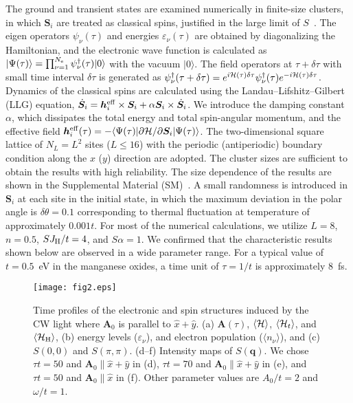 \documentclass[aps,twocolumn,showpacs,prl,amsmath,amssymb]{revtex4-1}
\begin{document}
The ground and transient states are examined numerically in finite-size clusters, in which 
$\bm{S}_i$ are treated as classical spins, justified in the large limit of $S$~\cite{koshibae1}. 
The eigen operators $\psi_\nu(\tau)$ and energies $\varepsilon_\nu(\tau)$ are obtained by diagonalizing the Hamiltonian, and the electronic wave function is calculated as $|\Psi(\tau)\rangle=\prod_{\nu=1}^{N_{\rm e}} \psi^\dagger_\nu (\tau) |0\rangle$ with the vacuum $| 0\rangle$. 
The field operators at $\tau+\delta \tau$ with small time interval $\delta \tau$ is generated as $\psi_\nu^\dagger (\tau + \delta \tau)=e^{i {\cal H}(\tau)\delta \tau}\psi_\nu^\dagger (\tau)e^{-i{\cal H}(\tau) \delta \tau}$. 
Dynamics of the classical spins are calculated using the Landau--Lifshitz--Gilbert (LLG) equation, 
$\dot{\bm{S}}_i=\bm{h}_i^{\rm eff} \times \bm{S}_i+\alpha \bm{S}_i \times \dot{\bm{S}}_i$. 
We introduce the damping constant $\alpha$, which dissipates the total energy and total spin-angular momentum, and the effective field 
$\bm{h}_i^{\rm eff}(\tau)=-\langle \Psi(\tau)| \partial {\cal H}/\partial \bm{S}_i|\Psi(\tau)\rangle$. 
The two-dimensional square lattice of $N_L=L^2$ sites ($L \leq 16$) with the periodic (antiperiodic) boundary condition along the $x$ ($y$) direction are adopted. 
The cluster sizes are sufficient to obtain the results with high reliability. The size dependence of the results are shown in the Supplemental Material (SM)~\cite{sm}. 
A small randomness is introduced in $\bm{S}_i$ at each site in the initial state, in which the maximum deviation in the polar angle is $\delta \theta=0.1$ corresponding to thermal fluctuation at temperature of approximately $0.001t$. 
%
For most of the numerical calculations, we utilize $L=8$, $n=0.5$, $SJ_{\rm H}/t=4$, and $S\alpha=1$. We confirmed that the characteristic results shown below are observed in a wide parameter range. 
%
For a typical value of $t=0.5$~eV in the manganese oxides, a time unit of $\tau=1/t$ is approximately 8~fs. 
\begin{figure}[t]
\begin{center}
\texttt{[image: fig2.eps]}
\end{center}
\caption{
Time profiles of the electronic and spin structures induced by the CW light where $\bm{A}_0$ is parallel to $\hat x+\hat y$. 
(a) $\bm{A}(\tau)$, $\langle {\cal H} \rangle$, $\langle {\cal H}_t\rangle$, and $\langle {\cal H}_{\rm H} \rangle $, 
(b) energy levels ($\varepsilon_\nu$), and electron population ($\langle n_\nu \rangle$), and (c) $S(0,0)$ and $S(\pi, \pi)$. 
(d--f) Intensity maps of $S(\bm{q})$. 
 We chose $\tau t=50$ and $\bm{A}_0 \parallel \hat{x}+\hat{y}$ in (d), 
$\tau t=70$ and $\bm{A}_0 \parallel \hat{x}+\hat{y}$ in (e), and 
$\tau t=50$ and $\bm{A}_0 \parallel \hat{x}$ in (f). 
%
Other parameter values are $A_0/t=2$ and $\omega/t=1$. 
}
\label{fig:fig2}
\end{figure}
\end{document}
